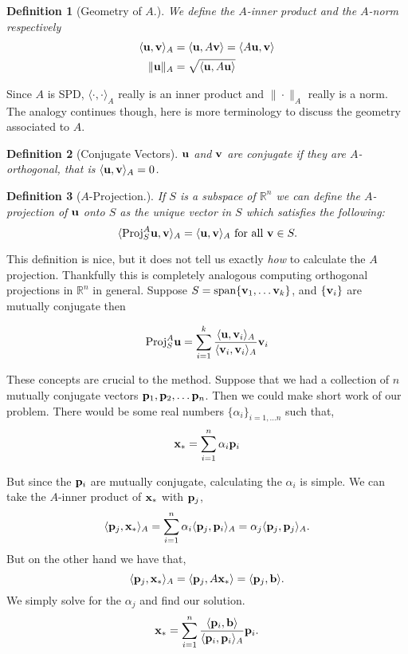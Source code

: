 \documentclass{article}
\newcommand{\bx}{{\bf x}}
\newcommand{\bb}{{\bf b}}
\newcommand{\bu}{{\bf u}}
\newcommand{\bv}{{\bf v}}
\newcommand{\bp}{{\bf p}}
\newcommand{\R}{\mathbb{R}}
\newcommand{\beq}{\begin{equation}}
\newcommand{\eeq}{\end{equation}}
\newtheorem{defn}{Definition}[section]
\theoremstyle{remark}
\begin{document}
\begin{defn}[Geometry of $A$.] We define the $A$-inner product and the $A$-norm respectively
\begin{align}
\langle \bu, \bv \rangle_A &= \langle \bu, A \bv \rangle = \langle A\bu,  \bv \rangle\\
\|\bu \|_A &= \sqrt{\langle \bu, A\bu \rangle}
\end{align}
\end{defn}

Since $A$ is SPD, $\langle \cdot, \cdot \rangle_A$ really is an inner product and $\| \cdot \|_A$ really is a norm. The analogy continues though, here is more terminology to discuss the geometry associated to $A$. 

\begin{defn}[Conjugate Vectors]  $\bu$ and $\bv$ are conjugate if they are $A$-orthogonal, that is $\langle \bu , \bv \rangle_A = 0$.
\end{defn}

\begin{defn}[$A$-Projection.] If $S$ is a subspace of $\R^n$ we can define the $A$-projection of $\bu$ onto $S$ as the unique vector in $S$ which satisfies the following:
\beq
\langle \text{\normalfont Proj}_S^A \bu, \bv \rangle_A = \langle \bu,\bv \rangle_A \text{ for all }\bv \in S.
\eeq
\end{defn}

This definition is nice, but it does not tell us exactly \textit{how} to calculate the $A$ projection. Thankfully this is completely analogous computing orthogonal projections in $\mathbb{R}^n$ in general. Suppose $S = \text{span}\{\bv_1, \dots \bv_k\}$, and $\{\bv_i\}$ are mutually conjugate then

\beq
\label{eq:Proj}
\text{Proj}^A_S \bu = \sum_{i=1}^k \frac{\langle \bu , \bv_i \rangle_A}{\langle \bv_i , \bv_i \rangle_A}\bv_i
\eeq

These concepts are crucial to the method. Suppose that we had a collection of $n$ mutually conjugate vectors $\bp_1, \bp_2, \dots \bp_n$. Then we could make short work of our problem. There would be some real numbers $\{\alpha_i\}_{i = 1,\dots n}$ such that, 
\beq
\label{eq:alphai}
\bx_* = \sum_{i=1}^n \alpha_i \bp_i
\eeq

But since the $\bp_i$ are mutually conjugate, calculating the $\alpha_i$ is simple. We can take the $A$-inner product of $\bx_*$ with $\bp_j$,
\beq
\label{eq:alphai2}
\langle \bp_j, \bx_* \rangle_A = \sum_{i = 1}^n \alpha_i \langle \bp_j, \bp_i\rangle_A = \alpha_j \langle \bp_j , \bp_j \rangle_A.
\eeq
But on the other hand we have that,
\beq
\label{eq:alphai3}
\langle \bp_j, \bx_* \rangle_A = \langle \bp_j, A\bx_*\rangle = \langle \bp_j, \bb \rangle.
\eeq
We simply solve for the $\alpha_j$ and find our solution. 
\beq 
\bx_* = \sum_{i=1}^n \frac{\langle \bp_i, \bb \rangle}{\langle \bp_i, \bp_i\rangle_A} \bp_i. 
\eeq
\end{document}
